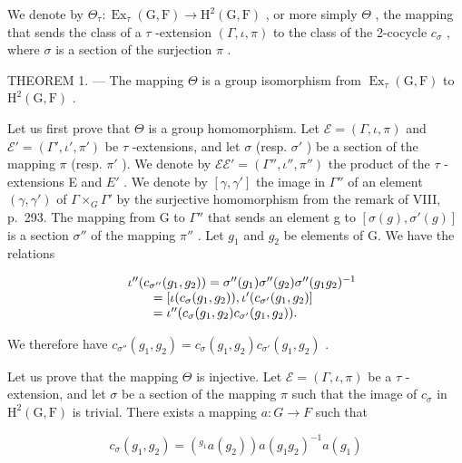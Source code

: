 We denote by \(\Theta_{\tau}: \operatorname{Ex}_{\tau}(\mathrm{G},\mathrm{F}) \to \mathrm{H}^{2}(\mathrm{G},\mathrm{F})\) , or more simply \(\Theta\) , the mapping that sends the class of a \(\tau\) -extension \((\Gamma,\iota,\pi)\) to the class of the 2-cocycle \(c_{\sigma}\) , where \(\sigma\) is a section of the surjection \(\pi\) .

THEOREM 1. --- The mapping \(\Theta\) is a group isomorphism from \(\operatorname{Ex}_{\tau}(\mathrm{G},\mathrm{F})\) to \(\mathrm{H}^2 (\mathrm{G},\mathrm{F})\) .

Let us first prove that \(\Theta\) is a group homomorphism. Let \(\mathcal{E} = (\Gamma, \iota, \pi)\) and \(\mathcal{E}' = (\Gamma', \iota', \pi')\) be \(\tau\) -extensions, and let \(\sigma\) (resp. \(\sigma'\) ) be a section of the mapping \(\pi\) (resp. \(\pi'\) ). We denote by \(\mathcal{E}\mathcal{E}' = (\Gamma'', \iota'', \pi'')\) the product of the \(\tau\) -extensions E and \(E'\) . We denote by \([\gamma, \gamma']\) the image in \(\Gamma''\) of an element \((\gamma, \gamma')\) of \(\Gamma \times_{G} \Gamma'\) by the surjective homomorphism from the remark of VIII, p.~293. The mapping from G to \(\Gamma''\) that sends an element g to \([\sigma(g), \sigma'(g)]\) is a section \(\sigma''\) of the mapping \(\pi''\) . Let \(g_1\) and \(g_2\) be elements of G. We have the relations

\[
\begin{array}{r l} & {\iota^ {\prime \prime} (c _ {\sigma^ {\prime \prime}} (g _ {1}, g _ {2})) = \sigma^ {\prime \prime} (g _ {1}) \sigma^ {\prime \prime} (g _ {2}) \sigma^ {\prime \prime} (g _ {1} g _ {2}) ^ {- 1}} \\ & {\qquad = [ \iota (c _ {\sigma} (g _ {1}, g _ {2})), \iota^ {\prime} (c _ {\sigma^ {\prime}} (g _ {1}, g _ {2}) ]} \\ & {\qquad = \iota^ {\prime \prime} (c _ {\sigma} (g _ {1}, g _ {2}) c _ {\sigma^ {\prime}} (g _ {1}, g _ {2})).} \end{array}
\]

We therefore have \(c_{\sigma''}(g_1, g_2) = c_\sigma(g_1, g_2)c_{\sigma'}(g_1, g_2)\) .

Let us prove that the mapping \(\Theta\) is injective. Let \(\mathcal{E} = (\Gamma, \iota, \pi)\) be a \(\tau\) -extension, and let \(\sigma\) be a section of the mapping \(\pi\) such that the image of \(c_{\sigma}\) in \(\mathrm{H}^{2}(\mathrm{G}, \mathrm{F})\) is trivial. There exists a mapping \(a : G \to F\) such that

\[
c _ {\sigma} (g _ {1}, g _ {2}) = (^ {g _ {1}} a (g _ {2})) a (g _ {1} g _ {2}) ^ {- 1} a (g _ {1})
\]

